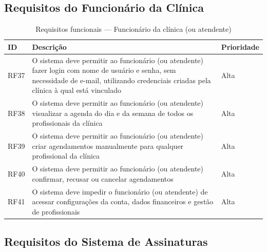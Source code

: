\subsection{Requisitos do Funcionário da Clínica}
\label{subsec:attendant-requirements}

\begin{table}[H]
  \centering
  \caption{Requisitos funcionais --- Funcionário da clínica (ou atendente)}
  \label{tab:attendant-requirements}
  \begin{tabular}{p{1.2cm}p{7cm}p{2cm}}
    \toprule
    \textbf{ID} &
    \textbf{Descrição} &
    \textbf{Prioridade} \\
    \midrule
    RF37 & O sistema deve permitir ao funcionário
           (ou atendente) fazer login com nome de
           usuário e senha, sem necessidade de
           e-mail, utilizando credenciais criadas
           pela clínica à qual está vinculado
         & Alta \\
    RF38 & O sistema deve permitir ao funcionário
           (ou atendente) visualizar a agenda do
           dia e da semana de todos os
           profissionais da clínica
         & Alta \\
    RF39 & O sistema deve permitir ao funcionário
           (ou atendente) criar agendamentos
           manualmente para qualquer profissional
           da clínica
         & Alta \\
    RF40 & O sistema deve permitir ao funcionário
           (ou atendente) confirmar, recusar ou
           cancelar agendamentos
         & Alta \\
    RF41 & O sistema deve impedir o funcionário
           (ou atendente) de acessar configurações
           da conta, dados financeiros e gestão
           de profissionais
         & Alta \\
    \bottomrule
  \end{tabular}
\end{table}

\subsection{Requisitos do Sistema de Assinaturas}
\label{subsec:subscription-requirements}

